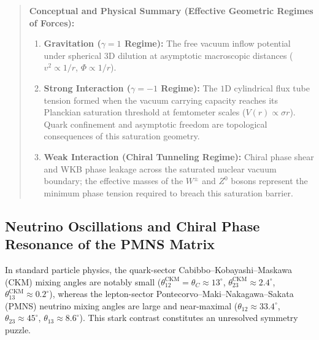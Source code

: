 \begin{quote}
    \small
    \textbf{Conceptual and Physical Summary (Effective Geometric Regimes of Forces):}
    \begin{enumerate}
        \item \textbf{Gravitation ($\gamma = 1$ Regime):} The free vacuum inflow potential under spherical $3\mathrm{D}$ dilution at asymptotic macroscopic distances ($v^2 \propto 1/r$, $\Phi \propto 1/r$).
        \item \textbf{Strong Interaction ($\gamma = -1$ Regime):} The $1\mathrm{D}$ cylindrical flux tube tension formed when the vacuum carrying capacity reaches its Planckian saturation threshold at femtometer scales ($V(r) \propto \sigma r$). Quark confinement and asymptotic freedom are topological consequences of this saturation geometry.
        \item \textbf{Weak Interaction (Chiral Tunneling Regime):} Chiral phase shear and WKB phase leakage across the saturated nuclear vacuum boundary; the effective masses of the $W^\pm$ and $Z^0$ bosons represent the minimum phase tension required to breach this saturation barrier.
    \end{enumerate}
\end{quote}

\subsection{Neutrino Oscillations and Chiral Phase Resonance of the PMNS Matrix}
\label{sec:notrino_pmns_main}

In standard particle physics, the quark-sector Cabibbo--Kobayashi--Maskawa (CKM) mixing angles are notably small ($\theta_{12}^{\mathrm{CKM}} = \theta_C \approx 13^\circ$, $\theta_{23}^{\mathrm{CKM}} \approx 2.4^\circ$, $\theta_{13}^{\mathrm{CKM}} \approx 0.2^\circ$), whereas the lepton-sector Pontecorvo--Maki--Nakagawa--Sakata (PMNS) neutrino mixing angles are large and near-maximal ($\theta_{12} \approx 33.4^\circ$, $\theta_{23} \approx 45^\circ$, $\theta_{13} \approx 8.6^\circ$). This stark contrast constitutes an unresolved symmetry puzzle.

